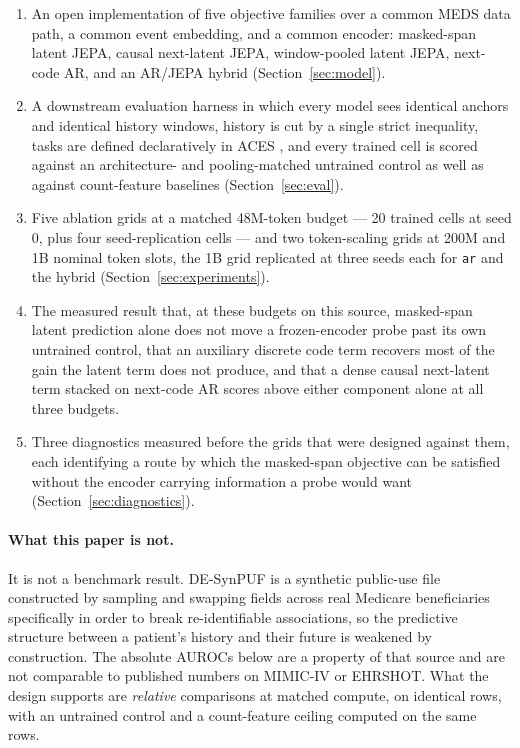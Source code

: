 \documentclass[11pt,a4paper]{article}
\newcommand{\code}[1]{\texttt{\small #1}}
\begin{document}
\begin{enumerate}[leftmargin=*,itemsep=2pt,topsep=3pt]
\item An open implementation of five objective families over a common MEDS
      \citep{meds} data path, a common event embedding, and a common encoder:
      masked-span latent JEPA, causal next-latent JEPA, window-pooled latent
      JEPA, next-code AR, and an AR/JEPA hybrid (Section~\ref{sec:model}).
\item A downstream evaluation harness in which every model sees identical
      anchors and identical history windows, history is cut by a single strict
      inequality, tasks are defined declaratively in ACES \citep{aces}, and
      every trained cell is scored against an architecture- and pooling-matched
      untrained control as well as against count-feature baselines
      (Section~\ref{sec:eval}).
\item Five ablation grids at a matched 48M-token budget --- 20 trained cells at
      seed 0, plus four seed-replication cells --- and two token-scaling grids
      at 200M and 1B nominal token slots, the 1B grid replicated at three
      seeds each for \code{ar} and the hybrid (Section~\ref{sec:experiments}).
\item The measured result that, at these budgets on this source, masked-span
      latent prediction alone does not move a frozen-encoder probe past its own
      untrained control, that an auxiliary discrete code term recovers most of
      the gain the latent term does not produce, and that a dense causal
      next-latent term stacked on next-code AR scores above either component
      alone at all three budgets.
\item Three diagnostics measured before the grids that were designed against
      them, each identifying a route by which the masked-span objective can be
      satisfied without the encoder carrying information a probe would want
      (Section~\ref{sec:diagnostics}).
\end{enumerate}

\paragraph{What this paper is not.}
It is not a benchmark result. DE-SynPUF is a synthetic public-use file
constructed by sampling and swapping fields across real Medicare beneficiaries
specifically in order to break re-identifiable associations, so the predictive
structure between a patient's history and their future is weakened by
construction. The absolute AUROCs below are a property of that source and are
not comparable to published numbers on MIMIC-IV or EHRSHOT. What the design
supports are \emph{relative} comparisons at matched compute, on identical rows,
with an untrained control and a count-feature ceiling computed on the same
rows.
\end{document}
